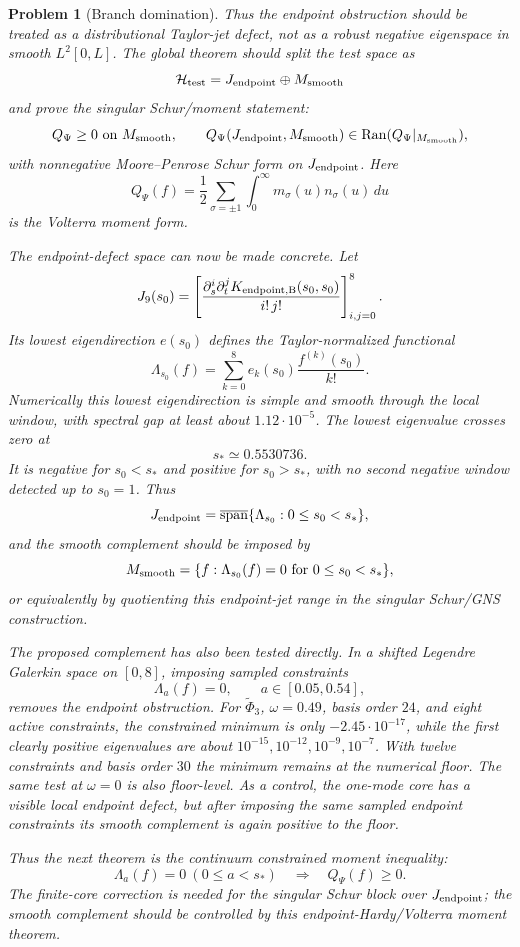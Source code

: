 \documentclass[11pt]{article}
\newtheorem{problem}[theorem]{Problem}
\begin{document}
\begin{problem}[Branch domination]
Thus the endpoint obstruction should be treated as a distributional
Taylor-jet defect, not as a robust negative eigenspace in smooth $L^2[0,L]$.
The global theorem should split the test space as
\[
  \mathcal H_{\rm test}=J_{\rm endpoint}\oplus M_{\rm smooth}
\]
and prove the singular Schur/moment statement:
\[
  Q_\Psi\ge0\ \text{on }M_{\rm smooth},\qquad
  Q_\Psi(J_{\rm endpoint},M_{\rm smooth})\in{\rm Ran}(Q_\Psi|_{M_{\rm smooth}}),
\]
with nonnegative Moore--Penrose Schur form on $J_{\rm endpoint}$.  Here
\[
 Q_\Psi(f)=
 \frac12\sum_{\sigma=\pm1}\int_0^\infty m_\sigma(u)n_\sigma(u)\,du
\]
is the Volterra moment form.

The endpoint-defect space can now be made concrete.  Let
\[
 J_9(s_0)=
 \left[
 \frac{\partial_s^i\partial_t^jK_{\rm endpoint,B}(s_0,s_0)}{i!\,j!}
 \right]_{i,j=0}^{8}.
\]
Its lowest eigendirection \(e(s_0)\) defines the Taylor-normalized functional
\[
  \Lambda_{s_0}(f)=\sum_{k=0}^8 e_k(s_0)\frac{f^{(k)}(s_0)}{k!}.
\]
Numerically this lowest eigendirection is simple and smooth through the local
window, with spectral gap at least about \(1.12\cdot10^{-5}\).  The lowest
eigenvalue crosses zero at
\[
  s_* \simeq 0.5530736.
\]
It is negative for \(s_0<s_*\) and positive for \(s_0>s_*\), with no second
negative window detected up to \(s_0=1\).  Thus
\[
  J_{\rm endpoint}
  =
  \overline{\operatorname{span}}\{\Lambda_{s_0}:0\le s_0<s_*\},
\]
and the smooth complement should be imposed by
\[
  M_{\rm smooth}=\{f:\Lambda_{s_0}(f)=0\text{ for }0\le s_0<s_*\},
\]
or equivalently by quotienting this endpoint-jet range in the singular
Schur/GNS construction.

The proposed complement has also been tested directly.  In a shifted Legendre
Galerkin space on $[0,8]$, imposing sampled constraints
\[
  \Lambda_a(f)=0,\qquad a\in[0.05,0.54],
\]
removes the endpoint obstruction.  For $\widetilde\Phi_3$, $\omega=0.49$,
basis order $24$, and eight active constraints, the constrained minimum is
only $-2.45\cdot10^{-17}$, while the first clearly positive eigenvalues are
about $10^{-15},10^{-12},10^{-9},10^{-7}$.  With twelve constraints and basis
order $30$ the minimum remains at the numerical floor.  The same test at
$\omega=0$ is also floor-level.  As a control, the one-mode core has a visible
local endpoint defect, but after imposing the same sampled endpoint constraints
its smooth complement is again positive to the floor.

Thus the next theorem is the continuum constrained moment inequality:
\[
  \Lambda_a(f)=0\ (0\le a<s_*)\quad\Longrightarrow\quad
  Q_\Psi(f)\ge0.
\]
The finite-core correction is needed for the singular Schur block over
$J_{\rm endpoint}$; the smooth complement should be controlled by this
endpoint-Hardy/Volterra moment theorem.


\end{problem}
\end{document}
